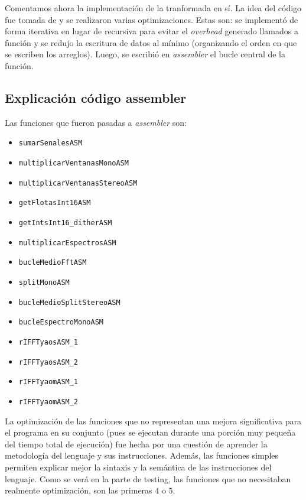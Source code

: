 \documentclass[%
    compressed,
    titlepage,
    narroweqnarray,
    inline,
    twoside,
    ]{ieee}
\begin{document}
Comentamos ahora la implementaci\'on de la tranformada en s\'i. La idea del c\'odigo fue tomada de \cite{dftC} y se realizaron varias optimizaciones.
Estas son: se implement\'o de forma iterativa en lugar de recursiva para evitar el \textit{overhead} generado llamados a funci\'on y se redujo la escritura
de datos al m\'inimo (organizando el orden en que se escriben los arreglos).
Luego, se escribi\'o en \textit{assembler} el bucle central de la funci\'on.


\subsection{Explicaci\'on c\'odigo assembler}

Las funciones que fueron pasadas a \textit{assembler} son:
\begin{itemize}
    \item \texttt{sumarSenalesASM}
    \item \texttt{multiplicarVentanasMonoASM}
    \item \texttt{multiplicarVentanasStereoASM}
    \item \texttt{getFlotasInt16ASM}
    \item \texttt{getIntsInt16\_ditherASM}
    \item \texttt{multiplicarEspectrosASM}
    \item \texttt{bucleMedioFftASM}
    \item \texttt{splitMonoASM}
    \item \texttt{bucleMedioSplitStereoASM}
    \item \texttt{bucleEspectroMonoASM}
    \item \texttt{rIFFTyaosASM\_1}
    \item \texttt{rIFFTyaosASM\_2}
    \item \texttt{rIFFTyaomASM\_1}
    \item \texttt{rIFFTyaomASM\_2}
\end{itemize}

La optimizaci\'on de las funciones que no representan una mejora significativa para el programa en su conjunto (pues se ejecutan durante una porci\'on muy peque\~na
del tiempo total de ejecuci\'on) fue hecha por una cuesti\'on de aprender la
metodolog\'ia del lenguaje y sus instrucciones. Adem\'as, las funciones simples permiten explicar mejor la sintaxis y la sem\'antica de las instrucciones
del lenguaje.
Como se ver\'a en la parte de testing, las funciones que no necesitaban realmente optimizaci\'on, son las primeras $4$ o $5$.
\end{document}
